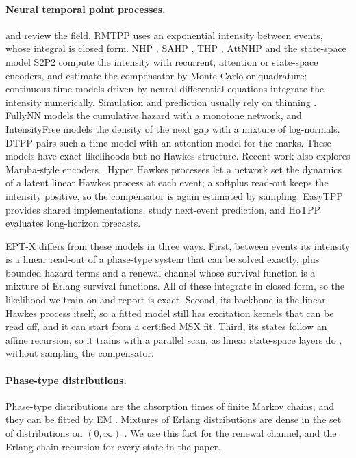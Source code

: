 \paragraph{Neural temporal point processes.} \citet{shchur2021neural} and \citet{zhou2026advances}
review the field. RMTPP \citep{du2016recurrent} uses an exponential intensity between events, whose
integral is closed form. NHP \citep{mei2017neural}, SAHP \citep{zhang2020self}, THP
\citep{zuo2020transformer}, AttNHP \citep{yang2022transformer} and the state-space model S2P2
\citep{chang2025deep} compute the intensity with recurrent, attention or state-space encoders, and
estimate the compensator by Monte Carlo or quadrature; continuous-time models driven by neural
differential equations \citep{jia2019neural,chen2021neural} integrate the intensity numerically.
Simulation and prediction usually rely on thinning \citep{ogata1981lewis}. FullyNN
\citep{omi2019fully} models the cumulative hazard with a monotone network, and IntensityFree
\citep{shchur2020intensity} models the density of the next gap with a mixture of log-normals. DTPP
\citep{panos2024decomposable} pairs such a time model with an attention model for the marks. These
models have exact likelihoods but no Hawkes structure. Recent work also explores Mamba-style
encoders \citep{gao2024mamba}. Hyper Hawkes processes \citep{boyd2025hyper} let a network set the
dynamics of a latent linear Hawkes process at each event; a softplus read-out keeps the intensity
positive, so the compensator is again estimated by sampling. EasyTPP \citep{xue2024easytpp}
provides shared implementations, \citet{bosser2023predictive} study next-event prediction, and
HoTPP \citep{karpukhin2024hotpp} evaluates long-horizon forecasts.

EPT-X differs from these models in three ways. First, between events its intensity is a linear
read-out of a phase-type system that can be solved exactly, plus bounded hazard terms and a
renewal channel whose survival function is a mixture of Erlang survival functions. All of these
integrate in closed form, so the likelihood we train on and report is exact. Second, its backbone
is the linear Hawkes process itself, so a fitted model still has excitation kernels that can be
read off, and it can start from a certified MSX fit. Third, its states follow an affine recursion,
so it trains with a parallel scan, as linear state-space layers do \citep{smith2023simplified},
without sampling the compensator.

\paragraph{Phase-type distributions.} Phase-type distributions are the absorption times of finite
Markov chains, and they can be fitted by EM \citep{asmussen1996fitting}. Mixtures of Erlang
distributions are dense in the set of distributions on $(0,\infty)$
\citep{tijms1994stochastic,lee2010modeling}. We use this fact for the renewal channel, and the
Erlang-chain recursion for every state in the paper.
